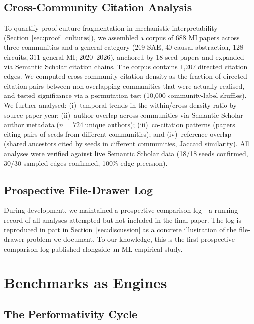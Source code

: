 \documentclass{article}
\begin{document}
\subsection{Cross-Community Citation Analysis}

To quantify proof-culture fragmentation in mechanistic interpretability (Section~\ref{sec:proof_cultures}), we assembled a corpus of 688 MI papers across three communities and a general category (209 SAE, 40 causal abstraction, 128 circuits, 311 general MI; 2020--2026), anchored by 18 seed papers and expanded via Semantic Scholar citation chains. The corpus contains 1,207 directed citation edges. We computed cross-community citation density as the fraction of directed citation pairs between non-overlapping communities that were actually realised, and tested significance via a permutation test (10,000 community-label shuffles). We further analysed: (i)~temporal trends in the within/cross density ratio by source-paper year; (ii)~author overlap across communities via Semantic Scholar author metadata ($n = 724$ unique authors); (iii)~co-citation patterns (papers citing pairs of seeds from different communities); and (iv)~reference overlap (shared ancestors cited by seeds in different communities, Jaccard similarity). All analyses were verified against live Semantic Scholar data (18/18 seeds confirmed, 30/30 sampled edges confirmed, 100\% edge precision).

\subsection{Prospective File-Drawer Log}

During development, we maintained a prospective comparison log---a running record of all analyses attempted but not included in the final paper. The log is reproduced in part in Section~\ref{sec:discussion} as a concrete illustration of the file-drawer problem we document. To our knowledge, this is the first prospective comparison log published alongside an ML empirical study.

\section{Benchmarks as Engines}
\label{sec:performativity}

\subsection{The Performativity Cycle}
\end{document}
